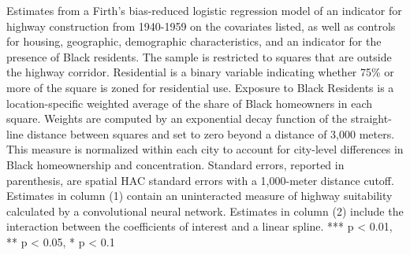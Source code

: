 \begin{table}[h]
\begin{threeparttable}
\begin{tablenotes}[flushleft]
\item Estimates from a Firth's bias-reduced logistic regression model of an indicator for highway construction from 1940-1959 on the covariates listed, as well as controls for housing, geographic, demographic characteristics, and an indicator for the presence of Black residents. The sample is restricted to squares that are outside the highway corridor. Residential is a binary variable indicating whether 75\% or more of the square is zoned for residential use. Exposure to Black Residents is a location-specific weighted average of the share of Black homeowners in each square. Weights are computed by an exponential decay function of the straight-line distance between squares and set to zero beyond a distance of 3,000 meters. This measure is normalized within each city to account for city-level differences in Black homeownership and concentration. Standard errors, reported in parenthesis, are \textcite{conley_gmm_1999} spatial HAC standard errors with a 1,000-meter distance cutoff. Estimates in column (1) contain an uninteracted measure of highway suitability calculated by a convolutional neural network. Estimates in column (2) include the interaction between the coefficients of interest and a linear spline. *** p < 0.01, ** p < 0.05, * p < 0.1
\end{tablenotes}
\end{threeparttable}
\end{table}
